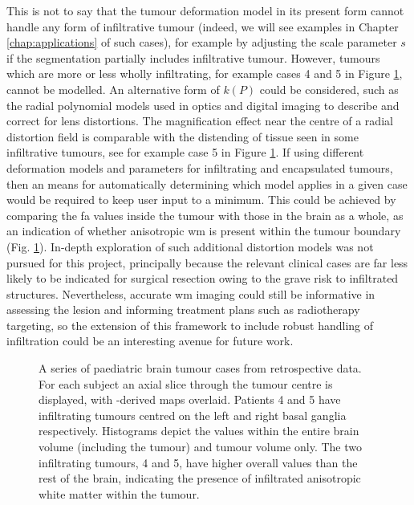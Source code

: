 This is not to say that the tumour deformation model in its present form cannot handle any form of infiltrative tumour (indeed, we will see examples in Chapter \ref{chap:applications} of such cases), for example by adjusting the scale parameter $s$ if the segmentation partially includes infiltrative tumour.
However, tumours which are more or less wholly infiltrating, for example cases 4 and 5 in Figure \ref{fig:fa_hist}, cannot be modelled.
An alternative form of $k(P)$ could be considered, such as the radial polynomial models used in optics and digital imaging to describe and correct for lens distortions\autocite{Zhang2000a}.
The magnification effect near the centre of a radial distortion field is comparable with the distending of tissue seen in some infiltrative tumours, see for example case 5 in Figure \ref{fig:fa_hist}.
If using different deformation models and parameters for infiltrating and encapsulated tumours, then an means for automatically determining which model applies in a given case would be required to keep user input to a minimum.
This could be achieved by comparing the \gls{fa} values inside the tumour with those in the brain as a whole, as an indication of whether anisotropic \gls{wm} is present within the tumour boundary (Fig. \ref{fig:fa_hist}).
In-depth exploration of such additional distortion models was not pursued for this project, principally because the relevant clinical cases are far less likely to be indicated for surgical resection owing to the grave risk to infiltrated structures.
Nevertheless, accurate \gls{wm} imaging could still be informative in assessing the lesion and informing treatment plans such as radiotherapy targeting\autocite{Jena2005,Berberat2014}, so the extension of this framework to include robust handling of infiltration could be an interesting avenue for future work.

\begin{figure}[htb!]
  \caption[Intra-tumoural FA indicates infiltration]{A series of paediatric brain tumour cases from retrospective  data. For each subject an axial slice through the tumour centre is displayed, with -derived   maps overlaid. Patients 4 and 5 have infiltrating tumours centred on the left and right basal ganglia respectively. Histograms depict the  values within the entire brain volume (including the tumour) and tumour volume only. The two infiltrating tumours, 4 and 5, have higher overall  values than the rest of the brain, indicating the presence of infiltrated anisotropic white matter within the tumour.}
  \label{fig:fa_hist}
\end{figure}

